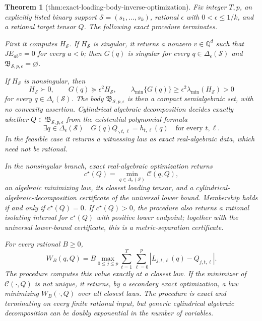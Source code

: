\documentclass{article}
\newtheorem{theorem}{Theorem}
\begin{document}
\begin{theorem}[thm:exact-loading-body-inverse-optimization]\label{thm:exact-loading-body-inverse-optimization}
Fix integer \(T,p\), an explicitly listed binary support \(\mathcal S=(s_1,\ldots,s_k)\), rational \(\epsilon\) with \(0<\epsilon\leq1/k\), and a rational target tensor \(Q\).  The following exact procedure terminates.

First it computes \(H_{\mathcal S}\).  If \(H_{\mathcal S}\) is singular, it returns a nonzero \(v\in\mathbb Q^d\) such that \(JE_{ab}v=0\) for every \(a<b\); then \(G(q)\) is singular for every \(q\in\Delta_{\epsilon}(\mathcal S)\) and \(\mathfrak B_{\mathcal S,p,\epsilon}=\varnothing\).

If \(H_{\mathcal S}\) is nonsingular, then
\[
 H_{\mathcal S}\succ0,
 \qquad
 G(q)\succeq\epsilon^2H_{\mathcal S},
 \qquad
 \lambda_{\min}\{G(q)\}\geq
 \epsilon^2\lambda_{\min}(H_{\mathcal S})>0
\]
for every \(q\in\Delta_{\epsilon}(\mathcal S)\).  The body \(\mathfrak B_{\mathcal S,p,\epsilon}\) is then a compact semialgebraic set, with no convexity assertion.  Cylindrical algebraic decomposition decides exactly whether \(Q\in\mathfrak B_{\mathcal S,p,\epsilon}\) from the existential polynomial formula
\[
 \exists q\in\Delta_{\epsilon}(\mathcal S)\quad
 G(q)Q_{\cdot,t,\ell}=h_{t,\ell}(q)
 \quad\text{for every }t,\ell.
\]
In the feasible case it returns a witnessing law as exact real-algebraic data, which need not be rational.

In the nonsingular branch, exact real-algebraic optimization returns
\[
 c^{\star}(Q)=\min_{q\in\Delta_{\epsilon}(\mathcal S)}\mathcal C(q,Q),
\]
an algebraic minimizing law, its closest loading tensor, and a cylindrical-algebraic-decomposition certificate of the universal lower bound.  Membership holds if and only if \(c^{\star}(Q)=0\).  If \(c^{\star}(Q)>0\), the procedure also returns a rational isolating interval for \(c^{\star}(Q)\) with positive lower endpoint; together with the universal lower-bound certificate, this is a metric-separation certificate.

For every rational \(B\geq0\),
\[
 W_B(q,Q)
 =B\max_{0\leq j\leq p}
       \sum_{t=1}^T\sum_{\ell=0}^p
       |L_{j,t,\ell}(q)-Q_{j,t,\ell}|.
\]
The procedure computes this value exactly at a closest law.  If the minimizer of \(\mathcal C(\cdot,Q)\) is not unique, it returns, by a secondary exact optimization, a law minimizing \(W_B(\cdot,Q)\) over all closest laws.  The procedure is exact and terminating on every finite rational input, but generic cylindrical algebraic decomposition can be doubly exponential in the number of variables.
\end{theorem}
\end{document}
